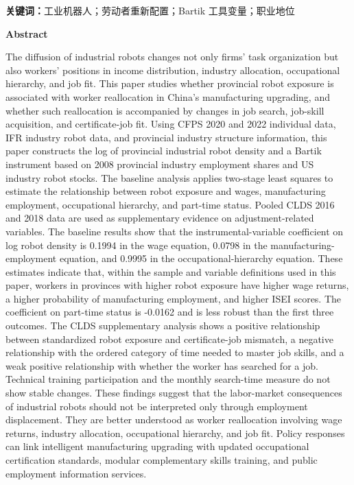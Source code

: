 \textbf{关键词：}工业机器人；劳动者重新配置；Bartik 工具变量；职业地位

\protect{}\label{_Toc1863639604}{}\textbf{Abstract}

The diffusion of industrial robots changes not only firms' task organization but also workers' positions in income distribution, industry allocation, occupational hierarchy, and job fit. This paper studies whether provincial robot exposure is associated with worker reallocation in China's manufacturing upgrading, and whether such reallocation is accompanied by changes in job search, job-skill acquisition, and certificate-job fit. Using CFPS 2020 and 2022 individual data, IFR industry robot data, and provincial industry structure information, this paper constructs the log of provincial industrial robot density and a Bartik instrument based on 2008 provincial industry employment shares and US industry robot stocks. The baseline analysis applies two-stage least squares to estimate the relationship between robot exposure and wages, manufacturing employment, occupational hierarchy, and part-time status. Pooled CLDS 2016 and 2018 data are used as supplementary evidence on adjustment-related variables. The baseline results show that the instrumental-variable coefficient on log robot density is 0.1994 in the wage equation, 0.0798 in the manufacturing-employment equation, and 0.9995 in the occupational-hierarchy equation. These estimates indicate that, within the sample and variable definitions used in this paper, workers in provinces with higher robot exposure have higher wage returns, a higher probability of manufacturing employment, and higher ISEI scores. The coefficient on part-time status is -0.0162 and is less robust than the first three outcomes. The CLDS supplementary analysis shows a positive relationship between standardized robot exposure and certificate-job mismatch, a negative relationship with the ordered category of time needed to master job skills, and a weak positive relationship with whether the worker has searched for a job. Technical training participation and the monthly search-time measure do not show stable changes. These findings suggest that the labor-market consequences of industrial robots should not be interpreted only through employment displacement. They are better understood as worker reallocation involving wage returns, industry allocation, occupational hierarchy, and job fit. Policy responses can link intelligent manufacturing upgrading with updated occupational certification standards, modular complementary skills training, and public employment information services.


